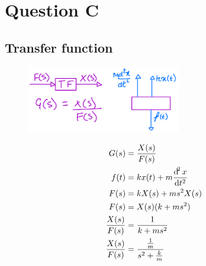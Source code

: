 \documentclass[12pt]{article}
\numberwithin{equation}{section}
\begin{document}
\section{Question C}
\subsection*{Transfer function}
\begin{figure}[H]
  \centering
  \includegraphics[width=0.6\textwidth]{./img/2-4blockdiagram.png}
\end{figure}
\begin{align}
  G(s) &= \frac{X(s)}{F(s)}\\
  f(t) &= kx(t) + m \frac{\dif ^2 x}{\dif t^2}\\
  F(s) &= kX(s) + ms^2 X(s)\\
  F(s) &= X(s) (k + ms^2)\\
  \frac{X(s)}{F(s)} &= \frac{1}{k + ms^2}\\
  \frac{X(s)}{F(s)} &= \frac{\frac{1}{m}}{s^2 + \frac{k}{m}}
\end{align}
\end{document}
